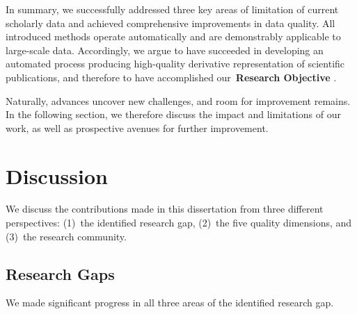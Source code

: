 In summary, we successfully addressed three key areas of limitation of current scholarly data and achieved comprehensive improvements in data quality. All introduced methods operate automatically and are demonstrably applicable to large-scale data. %
Accordingly, we argue to have succeeded in developing an automated process producing high-quality derivative representation of scientific publications, and therefore to have accomplished our \textbf{{\color{objblue-box}\faCrosshairs}\,Research Objective \large\checkmark}.

Naturally, advances uncover new challenges, and room for improvement remains. In the following section, we therefore discuss the impact and limitations of our work, as well as prospective avenues for further improvement.


\section{Discussion}

We discuss the contributions made in this dissertation from three different perspectives: (1)~the identified research gap, (2)~the five quality dimensions, and (3)~the research community.


\subsection{Research Gaps}\label{sec:discussion-rgap}
We made significant progress in all three areas of the identified research gap.

